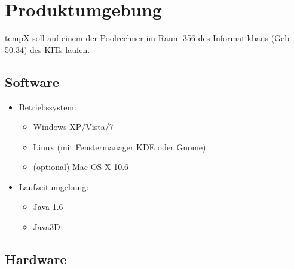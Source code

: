 \section{Produktumgebung}

\label{sec:produktumgebung}

\gls{tempX} soll auf einem der Poolrechner im Raum 356 des Informatikbaus (Geb 50.34) des KITs laufen.

\subsection{Software}

	\begin{itemize}
		
		\item Betriebssystem: 

			\begin{itemize}

				\item Windows XP/Vista/7

				\item Linux (mit Fenstermanager KDE oder Gnome)

				\item (optional) Mac OS X 10.6

			\end{itemize}
	
		\item Laufzeitumgebung:
		
			\begin{itemize}
				
				\item Java 1.6
				
				\item Java3D
				
			\end{itemize}
		
	\end{itemize}
	
\subsection{Hardware}

